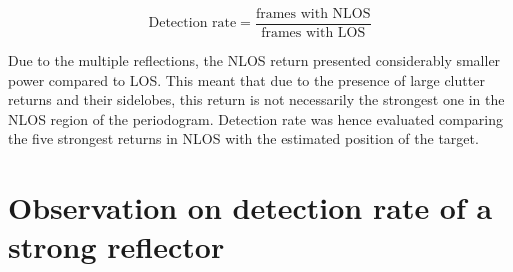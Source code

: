 \begin{equation*}
	\text{Detection rate} = \frac{\text{frames with NLOS}}{\text{frames with LOS}}
\end{equation*}

Due to the multiple reflections, the NLOS return presented considerably smaller power compared to LOS.
This meant that due to the presence of large clutter returns and their sidelobes, this return is not necessarily the strongest one in the NLOS region of the periodogram.
Detection rate was hence evaluated comparing the five strongest returns in NLOS with the estimated position of the target.


\section{Observation on detection rate of a strong reflector}

